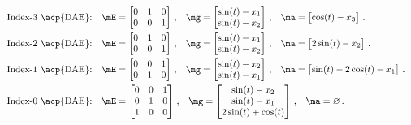 \begin{equation*}
  \begin{array}{l}
    \text{Index-3 \acp{DAE}:} \quad \mE = \begin{bmatrix}
      0 & 1 & 0 \\
      0 & 0 & 1
    \end{bmatrix} \, \text{,} \quad
    \mg = \begin{bmatrix}
      \sin(t) - x_{1} \\
      \sin(t) - x_{2}
    \end{bmatrix} \, \text{,} \quad
    \ma = \begin{bmatrix}
      \cos(t) - x_{3}
    \end{bmatrix} \, \text{.} \\[1.0em]
    \text{Index-2 \acp{DAE}:} \quad \mE = \begin{bmatrix}
      0 & 1 & 0 \\
      0 & 0 & 1
    \end{bmatrix} \, \text{,} \quad
    \mg = \begin{bmatrix}
      \sin(t) - x_{1} \\
      \sin(t) - x_{2}
    \end{bmatrix} \, \text{,} \quad
    \ma = \begin{bmatrix}
      2\sin(t) - x_{2}
    \end{bmatrix} \, \text{.} \\[1.0em]
    \text{Index-1 \acp{DAE}:} \quad \mE = \begin{bmatrix}
      0 & 0 & 1 \\
      0 & 1 & 0
    \end{bmatrix} \, \text{,} \quad
    \mg = \begin{bmatrix}
      \sin(t) - x_{2} \\
      \sin(t) - x_{1}
    \end{bmatrix} \, \text{,} \quad
    \ma = \begin{bmatrix}
      \sin(t) - 2\cos(t) - x_{1}
    \end{bmatrix} \, \text{.} \\[1.0em]
    \text{Index-0 \acp{DAE}:} \quad \mE = \begin{bmatrix}
      0 & 0 & 1 \\
      0 & 1 & 0 \\
      1 & 0 & 0
    \end{bmatrix} \, \text{,} \quad
    \mg = \begin{bmatrix}
      \sin(t) - x_{2} \\
      \sin(t) - x_{1} \\
      2\sin(t) + \cos(t)
    \end{bmatrix} \, \text{,} \quad
    \ma = \varnothing \, \text{.}
  \end{array}
\end{equation*}
